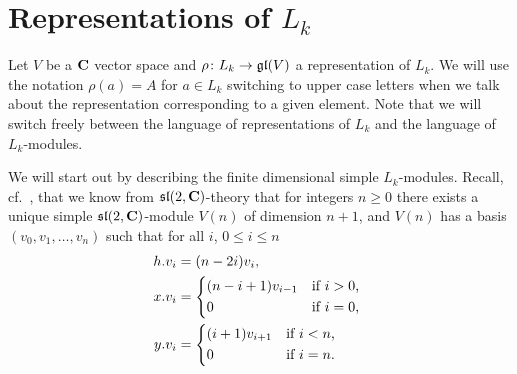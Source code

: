 \section{Representations of \texorpdfstring{$L_k$}{L\_k}}

Let $V$ be a $\mathbf{C}$ vector space and $\rho\colon L_k \to \mathfrak{gl}(V)$ a representation of $L_k$. We will use the notation $\rho(a)=A$ for $a\in L_k$ switching to upper case letters when we talk about the representation corresponding to a given element. Note that we will switch freely between the language of representations of $L_k$ and the language of $L_k$-modules.

We will start out by describing the finite dimensional simple $L_k$-modules. Recall, cf.\ \cite[36]{jantzen}, that we know from $\mathfrak{sl}(2,\mathbf{C})$-theory that for integers $n\geq 0$ there exists a unique simple $\mathfrak{sl}(2,\mathbf{C})$-module $V(n)$ of dimension $n+1$, and $V(n)$ has a basis $(v_0,v_1,\dotsc,v_n)$ such that for all $i$, $0\leq i\leq n$
\begin{align}
  \begin{split}\label{eq:sl2modbasis}
    h.v_i &= (n-2i)v_i, \\
    x.v_i &=
    \begin{dcases*}
      (n-i+1)v_{i-1} & if $i>0$, \\
      0 & if $i=0$,
    \end{dcases*} \\
    y.v_i &=
    \begin{dcases*}
      (i+1)v_{i+1} & if $i<n$, \\
      0 & if $i=n$.
    \end{dcases*}
  \end{split}
\end{align}

